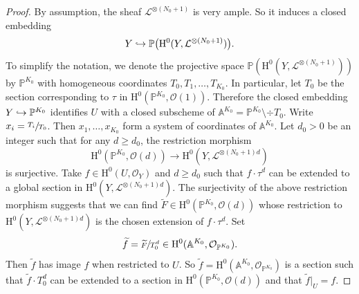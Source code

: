 \documentclass[11pt]{article}
\numberwithin{equation}{section}
\newcommand\hto{\mathrel{\lhook\joinrel\to}}
\theoremstyle{plain}
\theoremstyle{definition}
\newcommand{\ho}{\mathrm{H}}
\newcommand{\li}{\mathcal{L}}
\newcommand{\A}{\mathbb{A}}
\newcommand{\pr}{\mathbb{P}}
\begin{document}
\begin{proof}[Proof]
By assumption, the sheaf $\li^{\otimes (N_0+1)}$ is very ample. So it induces a closed embedding\vspace*{-3pt}
\[
Y\hto \pr\bigl(\ho^0(Y, \li^{\otimes (N_0+1)}) \bigr).
\]
To simplify the notation, we denote the projective space $\pr\left(\ho^0(Y, \li^{\otimes (N_0+1)})\right)$ by $\pr^{K_0}$ with homogeneous coordinates $T_0,T_1,\dots, T_{K_0}$. In particular, let $T_0$ be the section corresponding to $\tau$ in $\ho^0(\pr^{K_0},\mathcal{O}(1))$. Therefore the closed embedding $Y\hto \pr^{K_0}$ identifies $U$ with a closed subscheme of $\A^{K_0}=\pr^{K_0}\setminus\div T_0$. Write $x_i=\sfrac{T_i}{T_0}$. Then $x_1,\dots, x_{K_0}$ form a system of coordinates of $\A^{K_0}$. Let $d_0>0$ be an integer such that for any $d\geq d_0$, the restriction morphism
\[
\ho^0(\pr^{K_0},\mathcal{O}(d)) \to \ho^0(Y, \li^{\otimes (N_0+1)d})
\]
is surjective. Take $f\in \ho^0(U, \mathcal{O}_Y)$ and $d\geq d_0$ such that $f\cdot \tau^d$ can be extended to a global section in $ \ho^0(Y, \li^{\otimes (N_0+1)d})$. The surjectivity of the above restriction morphism suggests that we can find $\widetilde{F} \in\ho^0(\pr^{K_0},\mathcal{O}(d))$ whose restriction to $\ho^0(Y, \li^{\otimes (N_0+1)d})$ is the chosen extension of $f\cdot \tau^d$. Set\vspace*{-3pt}
\[
\widetilde{f}= \sfrac{\widetilde{F}}{T_0^d}\in \ho^0(\A^{K_0},\mathcal{O}_{\pr^{K_0}}).
\]
Then $\widetilde{f}$ has image $f$ when restricted to $U$. So $\widetilde{f}= \ho^0(\A^{K_0},\mathcal{O}_{\pr^{K_0}})$ is a section such that $\widetilde{f}\cdot T_0^d$ can be extended to a section in $\ho^0(\pr^{K_0},\mathcal{O}(d))$ and that $\widetilde{f}|_U=f$.


\end{proof}
\end{document}
